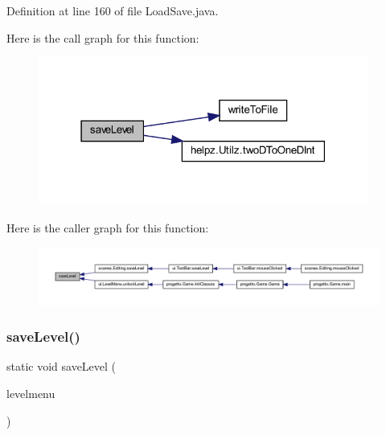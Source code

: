 Definition at line 160 of file Load\+Save.\+java.

Here is the call graph for this function\+:\nopagebreak
\begin{figure}[H]
\begin{center}
\leavevmode
\includegraphics[width=307pt]{classhelpz_1_1_load_save_ae7a60134f1712407689bfe3c45bc04a1_cgraph}
\end{center}
\end{figure}
Here is the caller graph for this function\+:\nopagebreak
\begin{figure}[H]
\begin{center}
\leavevmode
\includegraphics[width=350pt]{classhelpz_1_1_load_save_ae7a60134f1712407689bfe3c45bc04a1_icgraph}
\end{center}
\end{figure}
\mbox{\label{classhelpz_1_1_load_save_a518631414c15c47704a28422e8fbdc33}} 
\subsubsection{\texorpdfstring{save\+Level()}{saveLevel()}\hspace{0.1cm}{\footnotesize\ttfamily [2/2]}}
{\footnotesize\ttfamily static void save\+Level (\begin{DoxyParamCaption}\item[{\hyperlink{classui_1_1_level_menu}{Level\+Menu}}]{levelmenu }\end{DoxyParamCaption})\hspace{0.3cm}{\ttfamily [static]}}




